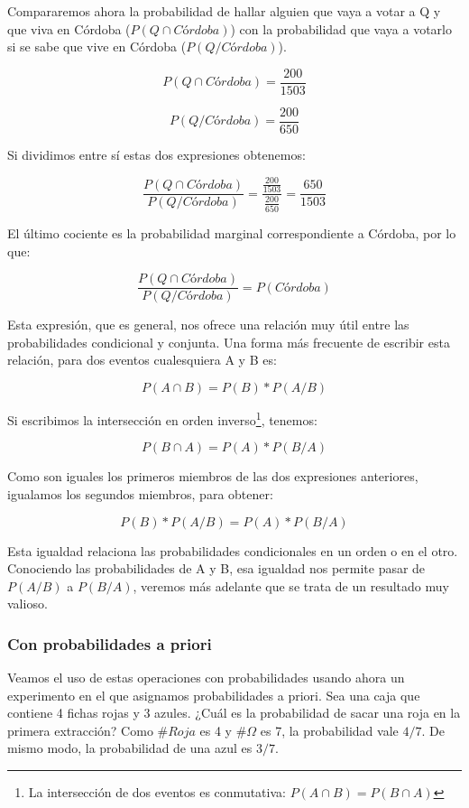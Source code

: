 \documentclass[]{article}
\let\rmarkdownfootnote\footnote%
\def\footnote{\protect\rmarkdownfootnote}
\begin{document}
Compararemos ahora la probabilidad de hallar alguien que vaya a votar a
Q y que viva en Córdoba (\(P(Q \cap Córdoba)\)) con la probabilidad que
vaya a votarlo si se sabe que vive en Córdoba (\(P(Q/Córdoba)\)).

\[P(Q \cap Córdoba) = \frac{200}{1503}\]

\[P(Q/Córdoba) = \frac{200}{650}\]

Si dividimos entre sí estas dos expresiones obtenemos:

\[\frac{P(Q \cap Córdoba)}{P(Q/Córdoba)} = \frac{\frac{200}{1503}}{\frac{200}{650}} = \frac{650}{1503}\]

El último cociente es la probabilidad marginal correspondiente a
Córdoba, por lo que:

\[\frac{P(Q \cap Córdoba)}{P(Q/Córdoba)} = P(Córdoba)\]

Esta expresión, que es general, nos ofrece una relación muy útil entre
las probabilidades condicional y conjunta. Una forma más frecuente de
escribir esta relación, para dos eventos cualesquiera A y B es:

\[P(A \cap B) = P(B)*P(A/B)\]

Si escribimos la intersección en orden inverso\footnote{La intersección
  de dos eventos es conmutativa: \(P(A \cap B)=P(B \cap A)\)}, tenemos:

\[P(B \cap A) = P(A)*P(B/A)\]

Como son iguales los primeros miembros de las dos expresiones
anteriores, igualamos los segundos miembros, para obtener:

\[P(B)*P(A/B) = P(A)*P(B/A)\]

Esta igualdad relaciona las probabilidades condicionales en un orden o
en el otro. Conociendo las probabilidades de A y B, esa igualdad nos
permite pasar de \(P(A/B)\) a \(P(B/A)\), veremos más adelante que se
trata de un resultado muy valioso.

\hypertarget{con-probabilidades-a-priori}{%
\subsubsection{Con probabilidades a
priori}\label{con-probabilidades-a-priori}}

Veamos el uso de estas operaciones con probabilidades usando ahora un
experimento en el que asignamos probabilidades a priori. Sea una caja
que contiene 4 fichas rojas y 3 azules. ¿Cuál es la probabilidad de
sacar una roja en la primera extracción? Como \(\#Roja\) es 4 y
\(\#\Omega\) es 7, la probabilidad vale \(4/7\). De mismo modo, la
probabilidad de una azul es \(3/7\).
\end{document}
